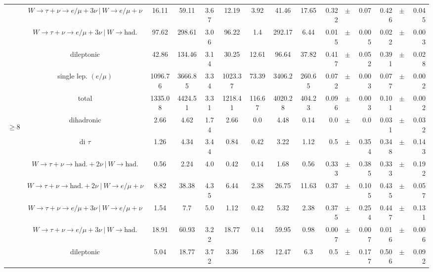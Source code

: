 \documentclass[12pt]{paper}
\begin{document}
\begin{table}[ht]
\begin{center}
{\begin{tabular}{|c|c|c|c|c|c|c|c|c|rrr|rrr|}
\cline{2-15}
 &$W\rightarrow \tau + \nu \rightarrow e/\mu+3\nu ~|~ W \rightarrow e/\mu + \nu$ & 16.11 & 59.11 & 3.67 & 12.19 & 3.92 & 41.46 & 17.65 & 0.322 & $\pm$ & 0.07 & 0.426 & $\pm$ & 0.045\\
\cline{2-15}
 &$W\rightarrow \tau + \nu \rightarrow e/\mu+3\nu ~|~ W \rightarrow \textrm{had.}$ & 97.62 & 298.61 & 3.06 & 96.22 & 1.4 & 292.17 & 6.44 & 0.015 & $\pm$ & 0.005 & 0.022 & $\pm$ & 0.003\\
\cline{2-15}
 &dileptonic & 42.86 & 134.46 & 3.14 & 30.25 & 12.61 & 96.64 & 37.82 & 0.417 & $\pm$ & 0.052 & 0.391 & $\pm$ & 0.028\\
\cline{2-15}
 &single lep. $(e/\mu)$ & 1096.76 & 3666.85 & 3.34 & 1023.37 & 73.39 & 3406.2 & 260.65 & 0.072 & $\pm$ & 0.003 & 0.077 & $\pm$ & 0.002\\
\cline{2-15}
 &total & 1335.08 & 4424.51 & 3.31 & 1218.41 & 116.67 & 4020.28 & 404.23 & 0.096 & $\pm$ & 0.003 & 0.101 & $\pm$ & 0.002\\
\hline
\hline\multirow{9}{*}{\begin{sideways}$\geq8$\end{sideways}}
 &dihadronic & 2.66 & 4.62 & 1.74 & 2.66 & 0.0 & 4.48 & 0.14 & 0.0 & $\pm$ & 0.0 & 0.031 & $\pm$ & 0.032\\
\cline{2-15}
 &di $\tau$ & 1.26 & 4.34 & 3.44 & 0.84 & 0.42 & 3.22 & 1.12 & 0.5 & $\pm$ & 0.354 & 0.348 & $\pm$ & 0.143\\
\cline{2-15}
 &$W\rightarrow \tau + \nu \rightarrow \textrm{had.}+2\nu ~|~ W \rightarrow \textrm{had.}$ & 0.56 & 2.24 & 4.0 & 0.42 & 0.14 & 1.68 & 0.56 & 0.333 & $\pm$ & 0.385 & 0.333 & $\pm$ & 0.192\\
\cline{2-15}
 &$W\rightarrow \tau + \nu \rightarrow \textrm{had.}+2\nu ~|~ W \rightarrow e/\mu + \nu$ & 8.82 & 38.38 & 4.35 & 6.44 & 2.38 & 26.75 & 11.63 & 0.37 & $\pm$ & 0.105 & 0.435 & $\pm$ & 0.057\\
\cline{2-15}
 &$W\rightarrow \tau + \nu \rightarrow e/\mu+3\nu ~|~ W \rightarrow e/\mu + \nu$ & 1.54 & 7.7 & 5.0 & 1.12 & 0.42 & 5.32 & 2.38 & 0.375 & $\pm$ & 0.254 & 0.447 & $\pm$ & 0.131\\
\cline{2-15}
 &$W\rightarrow \tau + \nu \rightarrow e/\mu+3\nu ~|~ W \rightarrow \textrm{had.}$ & 18.91 & 60.93 & 3.22 & 18.77 & 0.14 & 59.95 & 0.98 & 0.007 & $\pm$ & 0.007 & 0.016 & $\pm$ & 0.006\\
\cline{2-15}
 &dileptonic & 5.04 & 18.77 & 3.72 & 3.36 & 1.68 & 12.47 & 6.3 & 0.5 & $\pm$ & 0.177 & 0.506 & $\pm$ & 0.092\\
\cline{2-15}

\end{tabular}}
\end{center}
\end{table}
\end{document}
